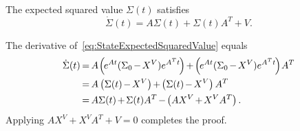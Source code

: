 \documentclass[twocolumn]{autart}
\begin{document}
\begin{thm}\label{th:StateProcessDerivative}
The expected squared value $\Sigma(t)$ satisfies
\begin{equation}
\dot{\Sigma}(t) = A\Sigma(t) + \Sigma(t)A^T + V. \label{eq:StateProcessDerivative}
\end{equation}
\end{thm}
\begin{pf}
The derivative of~\eqref{eq:StateExpectedSquaredValue} equals
\begin{align}
\dot{\Sigma}(t) & \hspace{-1pt}=\hspace{-1pt} A \hspace{-1pt}\left(\hspace{-1pt}e^{A t} (\Sigma_0 \hspace{-1pt}-\hspace{-1pt} X^V) e^{A^T t}\hspace{-1pt}\right) \hspace{-1pt}+\hspace{-1pt} \left(\hspace{-1pt}e^{A t} (\Sigma_0 \hspace{-1pt}-\hspace{-1pt} X^V) e^{A^T t}\hspace{-1pt}\right)\hspace{-1pt} A^T \nonumber \\
& \hspace{-1pt}=\hspace{-1pt} A \left(\Sigma(t) \hspace{-1pt}-\hspace{-1pt} X^V\right) \hspace{-1pt}+\hspace{-1pt} \left(\Sigma(t) \hspace{-1pt}-\hspace{-1pt} X^V\right) A^T \nonumber \\
& \hspace{-1pt}=\hspace{-1pt} A \Sigma(t) \hspace{-1pt}+\hspace{-1pt} \Sigma(t) A^T \hspace{-1pt}-\hspace{-1pt} \left(AX^V \hspace{-1pt}+\hspace{-1pt} X^V A^T\right).
\end{align}
Applying $AX^V + X^V A^T + V = 0$ completes the proof.
\end{pf}
\end{document}
